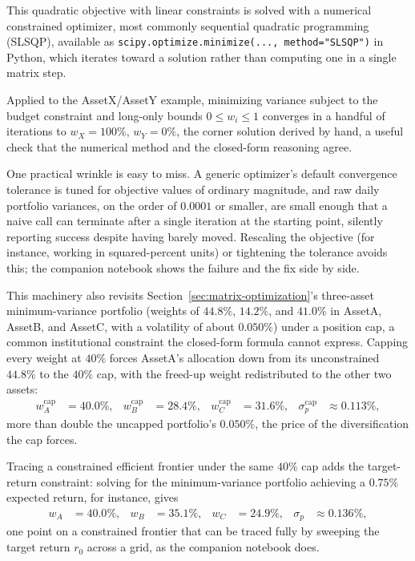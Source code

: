 \documentclass[../ai_in_finance]{subfiles}
\begin{document}
This quadratic objective with linear constraints is solved with a numerical constrained optimizer, most commonly sequential quadratic programming (SLSQP), available as \texttt{scipy.\allowbreak optimize.\allowbreak minimize(..., method="SLSQP")} in Python, which iterates toward a solution rather than computing one in a single matrix step.

Applied to the AssetX/AssetY example, minimizing variance subject to the budget constraint and long-only bounds $0 \le w_i \le 1$ converges in a handful of iterations to $w_X = 100\%$, $w_Y = 0\%$, the corner solution derived by hand, a useful check that the numerical method and the closed-form reasoning agree.

One practical wrinkle is easy to miss. A generic optimizer's default convergence tolerance is tuned for objective values of ordinary magnitude, and raw daily portfolio variances, on the order of $0.0001$ or smaller, are small enough that a naive call can terminate after a single iteration at the starting point, silently reporting success despite having barely moved. Rescaling the objective (for instance, working in squared-percent units) or tightening the tolerance avoids this; the companion notebook shows the failure and the fix side by side.

This machinery also revisits Section~\ref{sec:matrix-optimization}'s three-asset minimum-variance portfolio (weights of $44.8\%$, $14.2\%$, and $41.0\%$ in AssetA, AssetB, and AssetC, with a volatility of about $0.050\%$) under a position cap, a common institutional constraint the closed-form formula cannot express. Capping every weight at $40\%$ forces AssetA's allocation down from its unconstrained $44.8\%$ to the $40\%$ cap, with the freed-up weight redistributed to the other two assets:
\begin{align*}
w_A^{\text{cap}} &= 40.0\%, & w_B^{\text{cap}} &= 28.4\%, & w_C^{\text{cap}} &= 31.6\%, & \sigma_p^{\text{cap}} &\approx 0.113\%,
\end{align*}
more than double the uncapped portfolio's $0.050\%$, the price of the diversification the cap forces.

Tracing a constrained efficient frontier under the same $40\%$ cap adds the target-return constraint: solving for the minimum-variance portfolio achieving a $0.75\%$ expected return, for instance, gives
\begin{align*}
w_A &= 40.0\%, & w_B &= 35.1\%, & w_C &= 24.9\%, & \sigma_p &\approx 0.136\%,
\end{align*}
one point on a constrained frontier that can be traced fully by sweeping the target return $r_0$ across a grid, as the companion notebook does.
\end{document}
